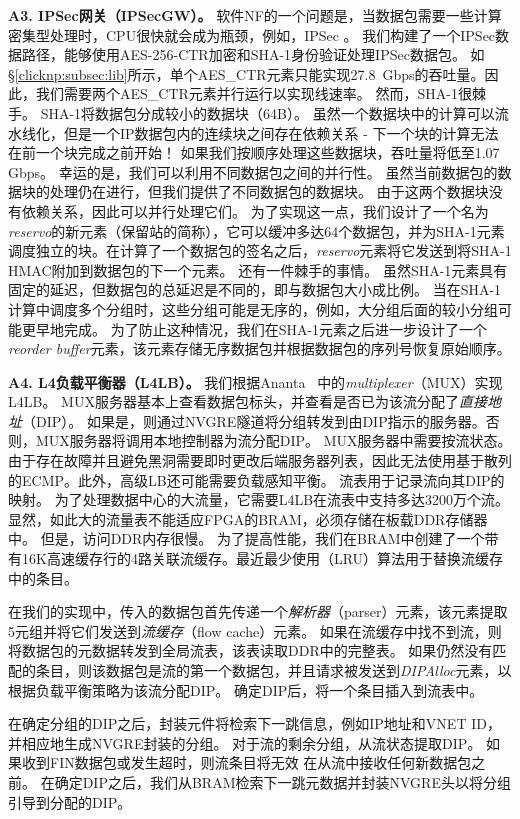 \textbf{A3. IPSec网关（IPSecGW）。}
软件NF的一个问题是，当数据包需要一些计算密集型处理时，CPU很快就会成为瓶颈，例如，IPSec \cite {packetshader}。
我们构建了一个IPSec数据路径，能够使用AES-256-CTR加密和SHA-1身份验证处理IPSec数据包。
如\S \ref {clicknp:subsec:lib}所示，单个AES\_CTR元素只能实现27.8~Gbps的吞吐量。因此，我们需要两个AES\_CTR元素并行运行以实现线速率。
然而，SHA-1很棘手。 SHA-1将数据包分成较小的数据块（64B）。
虽然一个数据块中的计算可以流水线化，但是一个IP数据包内的连续块之间存在依赖关系 - 下一个块的计算无法在前一个块完成之前开始！
如果我们按顺序处理这些数据块，吞吐量将低至1.07 Gbps。
幸运的是，我们可以利用不同数据包之间的并行性。
虽然当前数据包的数据块的处理仍在进行，但我们提供了不同数据包的数据块。
由于这两个数据块没有依赖关系，因此可以并行处理它们。
为了实现这一点，我们设计了一个名为\textit {reservo}的新元素（保留站的简称），它可以缓冲多达64个数据包，并为SHA-1元素调度独立的块。在计算了一个数据包的签名之后，\textit {reservo}元素将它发送到将SHA-1 HMAC附加到数据包的下一个元素。
还有一件棘手的事情。
虽然SHA-1元素具有固定的延迟，但数据包的总延迟是不同的，即与数据包大小成比例。
当在SHA-1计算中调度多个分组时，这些分组可能是无序的，例如，大分组后面的较小分组可能更早地完成。
为了防止这种情况，我们在SHA-1元素之后进一步设计了一个\textit {reorder buffer}元素，该元素存储无序数据包并根据数据包的序列号恢复原始顺序。

\textbf {A4. L4负载平衡器（L4LB）。}
我们根据Ananta~ \cite {ananta}中的\textit {multiplexer}（MUX）实现L4LB。
MUX服务器基本上查看数据包标头，并查看是否已为该流分配了\textit {直接地址}（DIP）。
如果是，则通过NVGRE隧道将分组转发到由DIP指示的服务器。否则，MUX服务器将调用本地控制器为流分配DIP。
MUX服务器中需要按流状态。
由于存在故障并且避免黑洞需要即时更改后端服务器列表，因此无法使用基于散列的ECMP。此外，高级LB还可能需要负载感知平衡。
流表用于记录流向其DIP的映射。
为了处理数据中心的大流量，它需要L4LB在流表中支持多达3200万个流。
显然，如此大的流量表不能适应FPGA的BRAM，必须存储在板载DDR存储器中。
但是，访问DDR内存很慢。
为了提高性能，我们在BRAM中创建了一个带有16K高速缓存行的4路关联流缓存。最近最少使用（LRU）算法用于替换流缓存中的条目。

在我们的实现中，传入的数据包首先传递一个\textit {解析器}（parser）元素，该元素提取5元组并将它们发送到\textit {流缓存}（flow cache）元素。
如果在流缓存中找不到流，则将数据包的元数据转发到全局流表，该表读取DDR中的完整表。
如果仍然没有匹配的条目，则该数据包是流的第一个数据包，并且请求被发送到\textit {DIPAlloc}元素，以根据负载平衡策略为该流分配DIP。
确定DIP后，将一个条目插入到流表中。

在确定分组的DIP之后，封装元件将检索下一跳信息，例如IP地址和VNET ID，并相应地生成NVGRE封装的分组。
对于流的剩余分组，从流状态提取DIP。
如果收到FIN数据包或发生超时，则流条目将无效
在从流中接收任何新数据包之前。
在确定DIP之后，我们从BRAM检索下一跳元数据并封装NVGRE头以将分组引导到分配的DIP。

